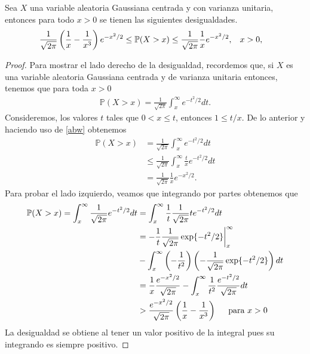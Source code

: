 \begin{proposition}
Sea $X$ una variable aleatoria Gaussiana centrada y con varianza unitaria, entonces para todo $x > 0$ se tienen las siguientes desigualdades.
	\begin{align*}
	\frac{1}{\sqrt{2 \pi}} \left( \frac{1}{x} - \frac{1}{x^3} \right) e^{-x^2 / 2} \leq \mathbb{P} (X & > x) \leq \frac{1}{\sqrt{2 \pi}} \frac{1}{x} e^{-x^2 / 2}, \hspace{0.3 cm}  x > 0, 	
	\end{align*}
\end{proposition}
\begin{proof}
Para mostrar el lado derecho de la desigualdad, recordemos que, si $X$ es una variable aleatoria Gaussiana centrada y de varianza unitaria entonces, tenemos que para toda $x > 0$
	\begin{align}
	\mathbb{P} (X > x) = \frac{1}{\sqrt{2 \pi}} \int_x^{\infty} e^{-t^2 / 2} dt. \label{abw}
	\end{align}
Consideremos, los valores $t$ tales que $0 < x \leq t$, entonces $1 \leq t/x$. De lo anterior y haciendo uso de \ref{abw} obtenemos
	\begin{align*}
	\mathbb{P} (X > x) & = \frac{1}{\sqrt{2 \pi}} \int_x^{\infty} e^{-t^2 / 2} dt \\
	& \leq \frac{1}{\sqrt{2 \pi}} \int_x^{\infty} \frac{t}{x} e^{-t^2 / 2} dt \\
	& = \frac{1}{\sqrt{2 \pi}} \frac{1}{x} e^{-x^2 / 2}.
	\end{align*}
Para probar el lado izquierdo, veamos que integrando por partes obtenemos que
\begin{align*}
	\mathbb{P} (X > x) = \int_{x}^{\infty} \frac{1}{\sqrt{2 \pi}} e^{- t^2 / 2} dt & = \int_{x}^{\infty} \frac{1}{t} \frac{1}{\sqrt{2 \pi}} t e^{- t^2 / 2} dt\\
    & = - \frac{1}{t} \frac{1}{\sqrt{2 \pi}} \exp\{- t^2 / 2 \} \bigg|_{x}^{\infty} \\
    & - \int_{x}^{\infty} \left( - \frac{1}{t^2} \right) \left( - \frac{1}{\sqrt{2 \pi}} \exp \{ - t^2 / 2 \} \right) dt \\
    & = \frac{1}{x} \frac{e^{- x^2 / 2}}{\sqrt{2 \pi}} - \int_{x}^{\infty} \frac{1}{t^2} \frac{e^{- t^2 / 2}}{\sqrt{2 \pi}} dt \\
    & > \frac{e^{-x^2 / 2}}{\sqrt{2 \pi}} \left( \frac{1}{x} - \frac{1}{x^3} \right) \hspace{0.5cm} \text{para } x > 0
\end{align*}
La desigualdad se obtiene al tener un valor positivo de la integral pues su integrando es siempre positivo.
\end{proof}

